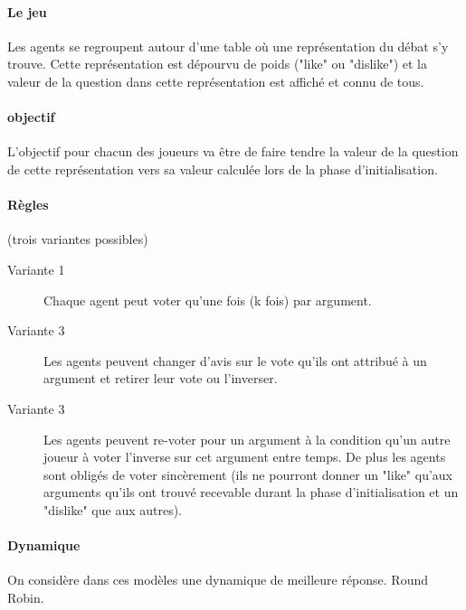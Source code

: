 \documentclass[12pt]{article}
\theoremstyle{defi}
\theoremstyle{not}
\theoremstyle{prob}
\begin{document}
  \paragraph{Le jeu\\}

    Les agents se regroupent autour d'une table où une représentation du débat s'y trouve. Cette représentation est dépourvu de poids ("like" ou "dislike") et la valeur de la question dans cette représentation est affiché et connu de tous.

  \paragraph{objectif\\}

  L'objectif pour chacun des joueurs va être de faire tendre la valeur de la question de cette représentation vers sa valeur calculée lors de la phase d'initialisation.

  \paragraph{Règles}(trois variantes possibles)
    \begin{description}
      \item[Variante 1] Chaque agent peut voter qu'une fois (k fois) par argument.

      \item[Variante 3] Les agents peuvent changer d'avis sur le vote qu'ils ont attribué à un argument et retirer leur vote ou l'inverser.

      \item[Variante 3] Les agents peuvent re-voter pour un argument à la condition qu'un autre joueur à voter l'inverse sur cet argument entre temps. De plus les agents sont obligés de voter sincèrement (ils ne pourront donner un "like" qu'aux arguments qu'ils ont trouvé recevable durant la phase d'initialisation et un "dislike" que aux autres).
    \end{description}

    \paragraph{Dynamique\\}
      On considère dans ces modèles une dynamique de meilleure réponse. Round Robin.
\end{document}
